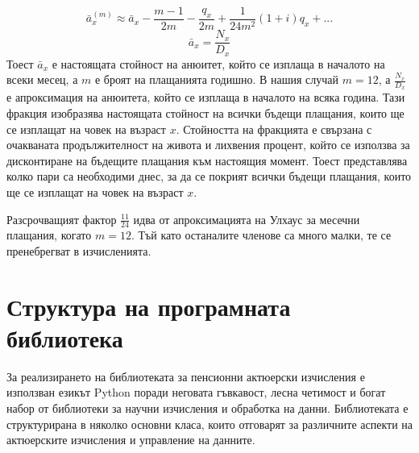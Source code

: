 \documentclass[a4paper,12pt]{article}
\begin{document}
\[\bar{a}^{(m)}_x\approx \bar{a}_x -\frac{m-1}{2m}-\frac{q_x}{2m}+\frac{1}{24m^2}(1+i)q_x+...\]
\[\bar{a}_x =\frac{N_x}{D_{x}}\]
Тоест $\bar{a}_x$ е настоящата стойност на анюитет, който се изплаща в началото на всеки месец, а $m$ е броят на плащанията годишно. В нашия случай $m=12$, а $\frac{N_x}{D_x}$ е апроксимация на анюитета, който се изплаща в началото на всяка година. Тази фракция изобразява настоящата стойност на всички бъдещи плащания, които ще се изплащат на човек на възраст $x$. Стойността на фракцията е свързана с очакваната продължителност на живота и лихвения процент, който се използва за дисконтиране на бъдещите плащания към настоящия момент. Тоест представлява колко пари са необходими днес, за да се покрият всички бъдещи плащания, които ще се изплащат на човек на възраст $x$.


Разсрочващият фактор $\frac{11}{24}$ идва от апроксимацията на Улхаус за месечни плащания, когато $m=12$. Тъй като останалите членове са много малки, те се пренебрегват в изчисленията.

\newpage
\section{Структура на програмната библиотека}

За реализирането на библиотеката за пенсионни актюерски изчисления е използван езикът Python поради неговата гъвкавост, лесна четимост и богат набор от библиотеки за научни изчисления и обработка на данни. Библиотеката е структурирана в няколко основни класа, които отговарят за различните аспекти на актюерските изчисления и управление на данните.
\end{document}
